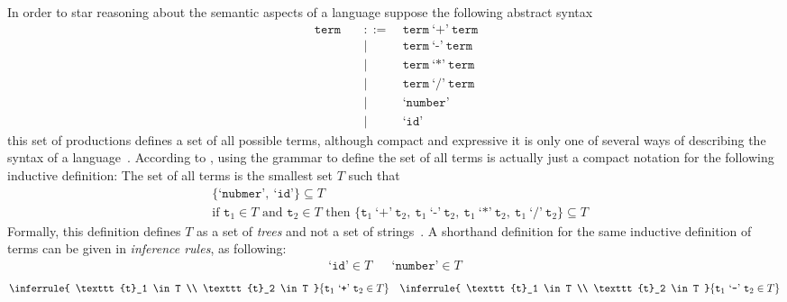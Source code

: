 \documentclass[
  oneside,
  english,
  coorientadorbanca,
  embeddedlogo,
  noabntexcite
]{ufsc-thesis-rn46-2019}
\def\ppp{::=}
\newcommand{\code}[1]{\texttt{#1}}
\newcommand{\bnfvar}[1]{\ \bnfvars{#1}}
\newcommand{\bnfvars}[1]{\code{#1}}
\newcommand{\bnfter}[1]{\ \bnfters{#1}}
\newcommand{\bnfters}[1]{\textrm{`}\code{#1}\textrm{'}}
\newcommand{\bnfprod}[2]{\bnfvars{#1} &\ &\ppp& #2}
\newcommand{\bnfmore}[1]{ && \mid{} & #1}
\begin{document}
In order to star reasoning about the semantic aspects of a language suppose the following abstract syntax
\begin{equation}~\label{eq:sample_term_ast}
  \begin{alignedat}{2}
    \bnfprod{term}{\bnfvar{term} \bnfter{+} \bnfvar{term}} \\
    \bnfmore{\bnfvar{term} \bnfter{-} \bnfvar{term}}       \\
    \bnfmore{\bnfvar{term} \bnfter{*} \bnfvar{term}}       \\
    \bnfmore{\bnfvar{term} \bnfter{/} \bnfvar{term}}       \\
    \bnfmore{\bnfter{number}}                              \\
    \bnfmore{\bnfter{id}}
  \end{alignedat}
\end{equation}
this set of productions defines a set of all possible terms, although compact and expressive it is only one of several ways of describing the syntax of a language~\cite{pierce2002types}.
According to \textcite{pierce2002types}, using the grammar to define the set of all terms is actually just a compact notation for the following inductive definition: The set of all terms is the smallest set $T$ such that
\begin{align}
   & \{\bnfters{nubmer}, \bnfter{id}\} \subseteq T \label{eq:example_clause1}            \\
   & \textrm{if } \bnfvars{t}_1 \in T \textrm{ and } \bnfvars{t}_2 \in T \textrm{ then }
  \{
  \bnfvars{t}_1 \bnfter{+} \bnfvar{t}_2,
  \bnfvar{t}_1 \bnfter{-} \bnfvar{t}_2,
  \bnfvar{t}_1 \bnfter{*} \bnfvar{t}_2,
  \bnfvar{t}_1 \bnfter{/} \bnfvar{t}_2
  \} \subseteq T\label{eq:example_clause2}
\end{align}
Formally, this definition defines $T$ as a set of \textit{trees} and not a set of strings~\cite{pierce2002types}.
A shorthand definition for the same inductive definition of terms can be given in \textit{inference rules}, as following:
\begin{align*}
  \bnfters{id} \in T &  & \bnfters{number} \in T
\end{align*}
\begin{align*}
  \inferrule{
  \bnfvars{t}_1 \in T \\ \bnfvars{t}_2 \in T
  }{
    \bnfvars{t}_1 \bnfter{+} \bnfvar{t}_2 \in T
  }
   &  &
  \inferrule{
  \bnfvars{t}_1 \in T \\ \bnfvars{t}_2 \in T
  }{
    \bnfvars{t}_1 \bnfter{-} \bnfvar{t}_2 \in T
  }
\end{align*}
\end{document}
